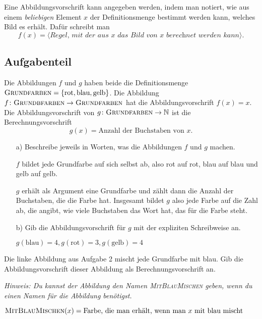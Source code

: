\documentclass[]{uebungsblatt}
\begin{document}
\begin{remark}{}
    Eine Abbildungsvorschrift kann angegeben werden, indem man notiert, wie aus einem \emph{beliebigen} Element $x$ der Definitionsmenge bestimmt werden kann, welches Bild es erhält. Dafür schreibt man
    \[f(x)=\langle\textit{Regel, mit der aus $x$ das Bild von $x$ berechnet werden kann}\rangle.\]
\end{remark}

\subsection*{Aufgabenteil}
\begin{exercise}
    Die Abbildungen $f$ und $g$ haben beide die Definitionsmenge 
    $\textsc{Grundfarben}=\{\text{rot},\text{blau},\text{gelb}\}$. Die Abbildung 
    $f\colon\textsc{Grundbfarben}\rightarrow\textsc{Grundfarben}$ hat die Abbildungsvorschrift $f(x)=x$.
    Die Abbildungsvorschrift von $g\colon\textsc{Grundfarben}\rightarrow\mathbb{N}$ ist die Berechnungsvorschrift \[g(x)=\text{Anzahl der Buchstaben von $x$}.\] 
    
    \begin{enumerate}
        \item[a)] Beschreibe jeweils in Worten, was die Abbildungen $f$ und $g$ machen.
        \begin{answerbox}[1in]
            $f$ bildet jede Grundfarbe auf sich selbst ab, also rot auf rot, blau auf blau und gelb auf gelb.
            
            $g$ erhält als Argument eine Grundfarbe und zählt dann die Anzahl der Buchstaben, die die Farbe hat. Insgesamt bildet $g$ also jede Farbe auf die Zahl ab, die angibt, wie viele Buchstaben das Wort hat, das für die Farbe steht.
        \end{answerbox}
        \item[b)] Gib die Abbildungsvorschrift für $g$ mit der expliziten Schreibweise an.
        \begin{answerbox}[0.5in]
            $g(\text{blau})=4, g(\text{rot})=3, g(\text{gelb})=4$
        \end{answerbox}
    \end{enumerate}
\end{exercise}
\begin{exercise}
    Die linke Abbildung aus Aufgabe 2 mischt jede Grundfarbe mit blau. Gib die Abbildungsvorschrift dieser Abbildung als Berechnungsvorschrift an.
    
    \emph{Hinweis: Du kannst der Abbildung den Namen \textsc{MitBlauMischen} geben, wenn du einen Namen für die Abbildung benötigst.}
    \begin{answerbox}[0.5in]
        $\textsc{MitBlauMischen}(x)=\text{Farbe, die man erhält, wenn man}~x~\text{mit blau mischt}$
    \end{answerbox}
\end{exercise}
\end{document}

